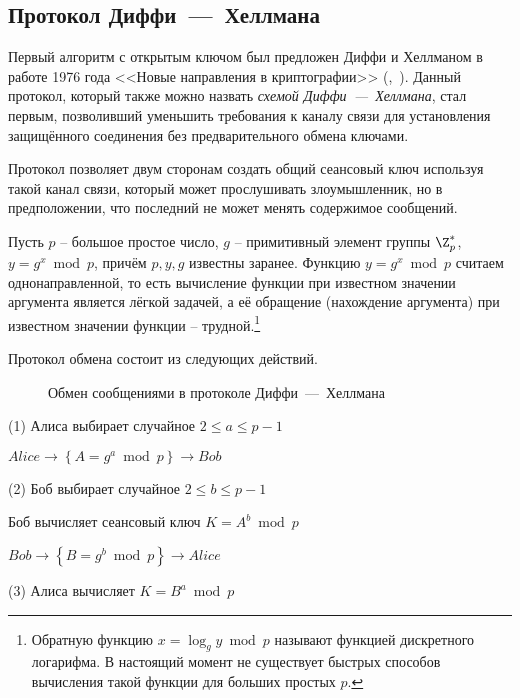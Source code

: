 \subsection{Протокол Диффи~---~Хеллмана}\label{section-protocols-diffie-hellman}

Первый алгоритм с открытым ключом был предложен Диффи и Хеллманом в работе 1976 года <<Новые направления в криптографии>> (,~\cite{Diffie:Hellman:1976}). Данный протокол, который также можно назвать \emph{схемой Диффи~---~Хеллмана}, стал первым, позволивший уменьшить требования к каналу связи для установления защищённого соединения без предварительного обмена ключами.

Протокол позволяет двум сторонам создать общий сеансовый ключ используя такой канал связи, который может прослушивать злоумышленник, но в предположении, что последний не может менять содержимое сообщений.

Пусть $p$ -- большое простое число, $g$ -- примитивный элемент группы $\Z_p^*$, ~ $y = g^x \bmod p$, причём $p, y, g$ известны заранее. Функцию $y=g^{x} \bmod p$ считаем однонаправленной, то есть вычисление функции при известном значении аргумента является лёгкой задачей, а её обращение (нахождение аргумента) при известном значении функции -- трудной.\footnote{Обратную функцию $x = \log_g y \bmod p$ называют функцией дискретного логарифма. В настоящий момент не существует быстрых способов вычисления такой функции для больших простых $p$.}

Протокол обмена состоит из следующих действий.

\begin{figure}[thb]
	\centering
	\begin{sequencediagram}
		
	\end{sequencediagram}
	\caption{Обмен сообщениями в протоколе Диффи~---~Хеллмана\label{fig:key_distribution-diffie-hellman}}
\end{figure}

\begin{protocol}
    \item[(1)] Алиса выбирает случайное $2 \leq a \leq p - 1$
    \item[{}] $Alice \to \left\{ A = g ^ a \bmod p \right\} \to Bob$
    \item[(2)] Боб выбирает случайное $2 \leq b \leq p-1$
    \item[{}] Боб вычисляет сеансовый ключ $K = A ^ b \bmod p$
    \item[{}] $Bob \to \left\{ B = g ^ b \bmod p \right\} \to Alice$
    \item[(3)] Алиса вычисляет $K = B ^ a \bmod p$
\end{protocol}

